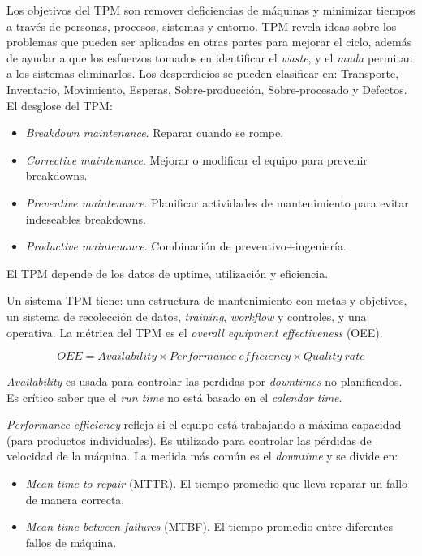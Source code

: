 \documentclass[]{article}
\begin{document}
Los objetivos del TPM son remover deficiencias de máquinas y minimizar tiempos a través de personas, procesos, sistemas y entorno. TPM revela ideas sobre los problemas que pueden ser aplicadas en otras partes para mejorar el ciclo, además de ayudar a que los esfuerzos tomados en identificar el \textit{waste}, y el \textit{muda} permitan a los sistemas eliminarlos. Los desperdicios se pueden clasificar en: Transporte, Inventario, Movimiento, Esperas, Sobre-producción, Sobre-procesado y Defectos. El desglose del TPM:

\begin{itemize}
	\item \textit{Breakdown maintenance}. Reparar cuando se rompe.
	\item \textit{Corrective maintenance}. Mejorar o modificar el equipo para prevenir breakdowns.
	\item \textit{Preventive maintenance}. Planificar actividades de mantenimiento para evitar indeseables breakdowns.
	\item \textit{Productive maintenance}. Combinación de preventivo+ingeniería.
\end{itemize}

El TPM depende de los datos de uptime, utilización y eficiencia.

Un sistema TPM tiene: una estructura de mantenimiento con metas y objetivos, un sistema de recolección de datos, \textit{training}, \textit{workflow} y controles, y una operativa. La métrica del TPM es el \textit{overall equipment effectiveness} (OEE).

\begin{equation}
OEE = Availability \times Performance \ efficiency \times Quality \ rate
\end{equation}

\textit{Availability} es usada para controlar las perdidas por \textit{downtimes} no planificados. Es crítico saber que el \textit{run time} no está basado en el \textit{calendar time}.

\textit{Performance efficiency} refleja si el equipo está trabajando a máxima capacidad (para productos individuales). Es utilizado para controlar las pérdidas de velocidad de la máquina. La medida más común es el \textit{downtime} y se divide en:
\begin{itemize}
	\item \textit{Mean time to repair} (MTTR). El tiempo promedio que lleva reparar un fallo de manera correcta.
	\item \textit{Mean time between failures} (MTBF). El tiempo promedio entre diferentes fallos de máquina.
\end{itemize}
\end{document}
